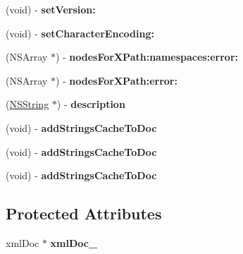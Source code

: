 \begin{DoxyCompactItemize}
\item 
\hypertarget{interface_g_data_x_m_l_document_ac43d5fecaa5ca156d4a2202604f63098}{
(void) -\/ {\bfseries setVersion:}}
\label{interface_g_data_x_m_l_document_ac43d5fecaa5ca156d4a2202604f63098}

\item 
\hypertarget{interface_g_data_x_m_l_document_a4c38b4821cf2fd94e0be91e5f58c47c5}{
(void) -\/ {\bfseries setCharacterEncoding:}}
\label{interface_g_data_x_m_l_document_a4c38b4821cf2fd94e0be91e5f58c47c5}

\item 
\hypertarget{interface_g_data_x_m_l_document_a8f72a4eb0c1d63deb9cf99ec44459cc4}{
(NSArray $\ast$) -\/ {\bfseries nodesForXPath:namespaces:error:}}
\label{interface_g_data_x_m_l_document_a8f72a4eb0c1d63deb9cf99ec44459cc4}

\item 
\hypertarget{interface_g_data_x_m_l_document_aa354334c070410bde942b706ce83e190}{
(NSArray $\ast$) -\/ {\bfseries nodesForXPath:error:}}
\label{interface_g_data_x_m_l_document_aa354334c070410bde942b706ce83e190}

\item 
\hypertarget{interface_g_data_x_m_l_document_a9bc2a02ba6251d9670127923b43df1a9}{
(\hyperlink{class_n_s_string}{NSString} $\ast$) -\/ {\bfseries description}}
\label{interface_g_data_x_m_l_document_a9bc2a02ba6251d9670127923b43df1a9}

\item 
\hypertarget{interface_g_data_x_m_l_document_a919a4f1c9925f4d6de2c09a92bfd0f35}{
(void) -\/ {\bfseries addStringsCacheToDoc}}
\label{interface_g_data_x_m_l_document_a919a4f1c9925f4d6de2c09a92bfd0f35}

\item 
\hypertarget{interface_g_data_x_m_l_document_a919a4f1c9925f4d6de2c09a92bfd0f35}{
(void) -\/ {\bfseries addStringsCacheToDoc}}
\label{interface_g_data_x_m_l_document_a919a4f1c9925f4d6de2c09a92bfd0f35}

\item 
\hypertarget{interface_g_data_x_m_l_document_a919a4f1c9925f4d6de2c09a92bfd0f35}{
(void) -\/ {\bfseries addStringsCacheToDoc}}
\label{interface_g_data_x_m_l_document_a919a4f1c9925f4d6de2c09a92bfd0f35}

\end{DoxyCompactItemize}
\subsection*{Protected Attributes}
\begin{DoxyCompactItemize}
\item 
\hypertarget{interface_g_data_x_m_l_document_a54e2a8eaa8c021fc07c10b32c014823a}{
xmlDoc $\ast$ {\bfseries xmlDoc\_\-}}
\label{interface_g_data_x_m_l_document_a54e2a8eaa8c021fc07c10b32c014823a}

\end{DoxyCompactItemize}



